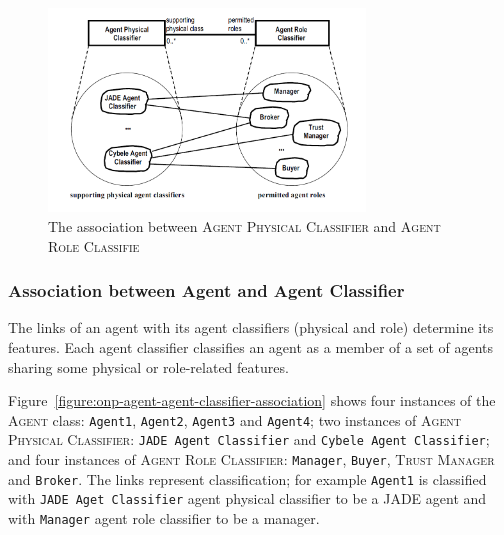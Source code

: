 \begin{figure}[h]
	\centering
	\includegraphics[width=0.75\textwidth]{images/onp-physical-classifier-role-classifier-association.png}
	\caption{The association between \textsc{Agent Physical Classifier} and \textsc{Agent Role Classifie}}
	\label{figure:onp-physical-classifier-role-classifier-association}
\end{figure}

\subsubsection*{Association between Agent and Agent Classifier}

The links of an agent with its agent classifiers (physical and role) determine its features.
Each agent classifier classifies an agent as a member of a set of agents sharing some physical or role-related features.

Figure~\ref{figure:onp-agent-agent-classifier-association} shows four instances of the \textsc{Agent} class: \texttt{Agent1}, \texttt{Agent2}, \texttt{Agent3} and \texttt{Agent4}; two instances of \textsc{Agent Physical Classifier}: \texttt{JADE Agent Classifier} and \texttt{Cybele Agent Classifier}; and four instances of \textsc{Agent Role Classifier}: \texttt{Manager}, \texttt{Buyer}, \textsc{Trust Manager} and \texttt{Broker}.
The links represent classification; for example \texttt{Agent1} is classified with \texttt{JADE Aget Classifier} agent physical classifier to be a JADE agent and with \texttt{Manager} agent role classifier to be a manager. 

